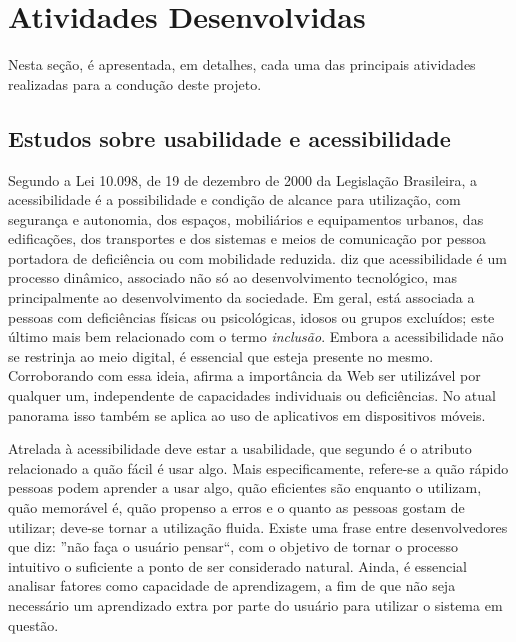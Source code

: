 \chapter{Atividades Desenvolvidas}\label{sec:ativ_desenvolvidas}
Nesta seção, é apresentada, em detalhes, cada uma das principais atividades realizadas para a condução deste projeto.

\section{Estudos sobre usabilidade e acessibilidade}\label{sec:estudos_usab_acess} 



 Segundo a Lei 10.098, de 19 de dezembro de 2000 da Legislação Brasileira, a acessibilidade é a possibilidade e condição de alcance para utilização, com segurança e autonomia, dos
espaços, mobiliários e equipamentos urbanos, das
edificações, dos transportes e dos sistemas e meios de comunicação por pessoa portadora de deficiência ou com mobilidade reduzida. \cite{torres2002acessibilidade} diz que acessibilidade é um processo dinâmico, associado não só ao desenvolvimento tecnológico, mas principalmente ao desenvolvimento da sociedade. Em geral, está associada a pessoas com deficiências físicas ou psicológicas, idosos ou grupos excluídos; este último mais bem relacionado com o termo \textit{inclusão}. Embora a acessibilidade não se restrinja ao meio digital, é essencial que esteja presente no mesmo. Corroborando com essa ideia, \cite{leew3c} afirma a importância da Web ser utilizável por qualquer um, independente de capacidades individuais ou deficiências. No atual panorama isso também se aplica ao uso de aplicativos em dispositivos móveis. 

Atrelada à acessibilidade deve estar a usabilidade, que segundo \cite{nielsenPrioritizingWebUsability}
é o atributo relacionado a quão fácil é usar algo. Mais especificamente, refere-se a quão rápido pessoas podem aprender a usar algo, quão eficientes são enquanto o utilizam, quão memorável é, quão propenso a erros e o quanto as pessoas gostam de utilizar; deve-se tornar a utilização fluida. Existe uma frase entre desenvolvedores que diz: ''não faça o usuário pensar``, com o objetivo de tornar o processo intuitivo o suficiente a ponto de ser considerado natural.
Ainda, é essencial analisar fatores como capacidade de aprendizagem, a fim de que não seja necessário um aprendizado extra por parte do usuário para utilizar o sistema em questão.


